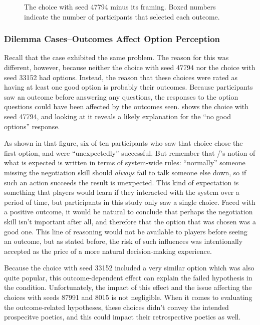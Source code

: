 \begin{figure}[h]
\caption[``Unexpected success'' choice 47794]{The choice with seed 47794 minus its framing. Boxed numbers indicate the number of participants that selected each outcome.}
\label{fig:e2-seed-47794}
\end{figure}


\subsubsection{Dilemma Cases--Outcomes Affect Option Perception}

Recall that the \unxs{} case exhibited the same problem.
%
The reason for this was different, however, because neither the choice with seed 47794 nor the choice with seed 33152 had  options.
%
Instead, the reason that these choices were rated as having at least one good option is probably their outcomes.
%
Because participants saw an outcome before answering any questions, the responses to the option questions could have been affected by the outcomes seen.
%
 shows the choice with seed 47794, and looking at it reveals a likely explanation for the ``no good options'' response.


As shown in that figure, six of ten participants who saw that choice chose the first option, and were ``unexpectedly'' successful.
%
But remember that \dunyazad/'s notion of what is expected is written in terms of system-wide rules: ``normally'' someone missing the negotiation skill should \emph{always} fail to talk someone else down, so if such an action succeeds the result is unexpected.
%
This kind of expectation is something that players would learn if they interacted with the system over a period of time, but participants in this study only saw a single choice.
%
Faced with a positive outcome, it would be natural to conclude that perhaps the negotiation skill isn't important after all, and therefore that the option that was chosen was a good one.
%
This line of reasoning would not be available to players before seeing an outcome, but as stated before, the risk of such influences was intentionally accepted as the price of a more natural decision-making experience.


Because the choice with seed 33152 included a very similar  option which was also quite popular, this outcome-dependent effect can explain the failed hypothesis in the \unxs{} condition.
%
Unfortunately, the impact of this effect and the  issue affecting the choices with seeds 87991 and 8015 is not negligible.
%
When it comes to evaluating the outcome-related hypotheses, these choices didn't convey the intended prospecitve poetics, and this could impact their retrospective poetics as well.


